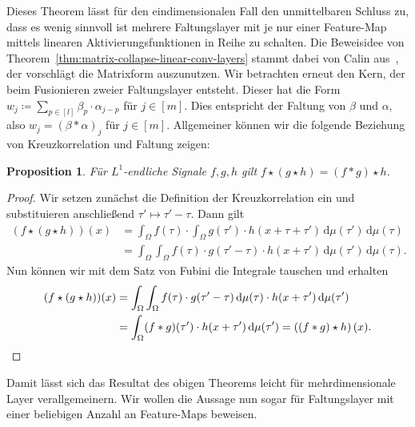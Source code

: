 \documentclass[paper=a4, 	%
		fontsize=11pt,
		abstract=true, 	%
		headsepline, 	%
		notitlepage	%
		]{scrartcl}
\newtheorem{proposition}[theorem]{Proposition}
\theoremstyle{definition}
\newcommand{\diff}{\,\textrm{d}}
\newcommand{\fNat}[1]{[ #1 ]}
\begin{document}
Dieses Theorem lässt für den eindimensionalen Fall den unmittelbaren Schluss zu, dass es wenig sinnvoll ist mehrere Faltungslayer mit je nur einer Feature-Map mittels linearen Aktivierungsfunktionen in Reihe zu schalten.
Die Beweisidee von Theorem~\ref{thm:matrix-collapse-linear-conv-layers} stammt dabei von Calin aus~\cite{Calin2020}, der vorschlägt die Matrixform auszunutzen.
Wir betrachten erneut den Kern, der beim Fusionieren zweier Faltungslayer entsteht.
Dieser hat die Form $w_j \coloneqq \sum_{p\in\fNat{l}} \beta_p \cdot \alpha_{j-p}$ für $j\in\fNat{m}$.
Dies entspricht der Faltung von $\beta$ und $\alpha$, also $w_j = (\beta * \alpha)_j$ für $j\in\fNat{m}$.
Allgemeiner können wir die folgende Beziehung von Kreuzkorrelation und Faltung zeigen:
\begin{proposition}\label{prop:associativity-cross-corr}
    Für $L^1$-endliche Signale $f,g,h$ gilt $f\star (g \star h) = (f*g)\star h$.
\end{proposition}
\begin{proof}
    Wir setzen zunächst die Definition der Kreuzkorrelation ein und substituieren anschließend $\tau' \mapsto \tau' - \tau$. Dann gilt
    \begin{align*}
        (f\star (g\star h))(x)
        &= \int_\Omega f(\tau) \cdot \int_\Omega g(\tau') \cdot h(x+\tau+\tau')\diff\mu(\tau') \diff \mu(\tau) \\
        &= \int_\Omega \int_\Omega f(\tau) \cdot g(\tau' - \tau)\cdot h(x+\tau')\diff\mu(\tau') \diff \mu(\tau).
    \end{align*}
    Nun können wir mit dem Satz von Fubini die Integrale tauschen und erhalten
    \begin{align*}
        (f\star (g\star h))(x)&= \int_\Omega\int_\Omega f(\tau) \cdot g(\tau'-\tau) \diff\mu(\tau) \cdot h(x+\tau')\diff\mu(\tau') \\
        &= \int_\Omega  (f * g)(\tau')\cdot h(x+\tau') \diff \mu(\tau')
        = \left( (f * g) \star h \right)(x).\qedhere
    \end{align*}
\end{proof}

Damit lässt sich das Resultat des obigen Theorems leicht für mehrdimensionale Layer verallgemeinern.
Wir wollen die Aussage nun sogar für Faltungslayer mit einer beliebigen Anzahl an Feature-Maps beweisen.
\end{document}
